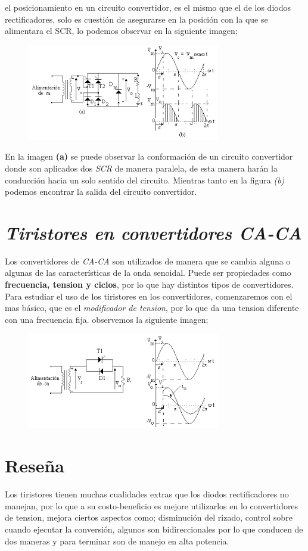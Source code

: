 \documentclass[11pt,a4paper]{article}
\begin{document}
el posicionamiento en un circuito convertidor, es el mismo que el de los diodos rectificadores, solo es cuestión de asegurarse en la posición con la que se alimentara el SCR, lo podemos observar en la siguiente imagen;

\begin{figure}[hbtp]
\centering
\includegraphics[scale=1]{8.png} 
\end{figure}

En la imagen \textbf{(a)} se puede observar la conformación de un circuito convertidor donde son aplicados dos \emph{SCR} de manera paralela, de esta manera harán la conducción hacia un solo sentido del circuito. Mientras tanto en la figura \emph{(b)} podemos encontrar la salida del circuito convertidor.

\section{\emph{Tiristores en convertidores CA-CA}}
Los convertidores de \emph{CA-CA} son utilizados de manera que se cambia alguna o algunas de las características de la onda senoidal. Puede ser propiedades como \textbf{frecuencia, tension y ciclos}, por lo que hay distintos tipos de convertidores. Para estudiar el uso de los tiristores en los convertidores, comenzaremos con el mas básico, que es el \emph{modificador de tension}, por lo que da una tension diferente con una frecuencia fija. observemos la siguiente imagen;

\begin{figure}[hbtp]
\centering
\includegraphics[scale=1]{9.png}
\end{figure}

\newpage

\section{Reseña}
Los tiristores tienen muchas cualidades extras que los diodos rectificadores no manejan, por lo que a su costo-beneficio es mejore utilizarlos en lo convertidores de tension, mejora ciertos aspectos como; disminución del rizado, control sobre cuando ejecutar la conversión, algunos son bidireccionales por lo que conducen de dos maneras y para terminar son de manejo en alta potencia.
\end{document}
